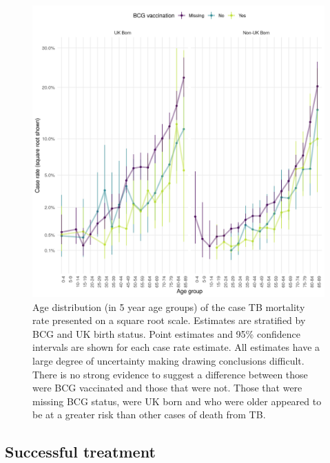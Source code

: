 \documentclass[11pt,twoside]{bristolthesis}
\begin{document}
  \begin{figure}
  
  {\centering \includegraphics[width=0.8\linewidth,]{chapters/tb-epi-england/figures/plot-tb-mort-age-dist} 
  
  }
  
  \caption[Age distribution (in 5 year age groups) of the case TB mortality rate presented on a square root scale.]{Age distribution (in 5 year age groups) of the case TB mortality rate presented on a square root scale. Estimates are stratified by BCG and UK birth status. Point estimates and 95\%  confidence intervals are shown for each case rate estimate. All estimates have a large degree of uncertainty making drawing conclusions difficult. There is no strong evidence to suggest a difference between those were BCG vaccinated and those that were not. Those that were missing BCG status, were UK born and who were older appeared to be at a greater risk than other cases of death from TB.}\label{fig:plot-tb-mort-age-dist}
  \end{figure}
  \hypertarget{successful-treatment}{%
  \subsection{Successful treatment}\label{successful-treatment}}
  
\end{document}
